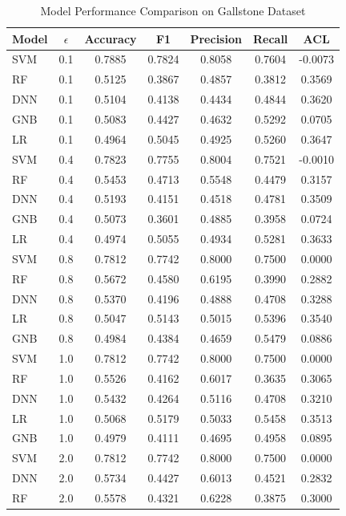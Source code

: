 \begin{table}[h]
\centering
\caption{Model Performance Comparison on Gallstone Dataset}
\label{tab:gallstone_comparison}
\begin{tabular}{lcccccc}
\hline
Model & $\epsilon$ & Accuracy & F1 & Precision & Recall & ACL \\
\hline
SVM & 0.1 & 0.7885 & 0.7824 & 0.8058 & 0.7604 & -0.0073 \\
RF & 0.1 & 0.5125 & 0.3867 & 0.4857 & 0.3812 & 0.3569 \\
DNN & 0.1 & 0.5104 & 0.4138 & 0.4434 & 0.4844 & 0.3620 \\
GNB & 0.1 & 0.5083 & 0.4427 & 0.4632 & 0.5292 & 0.0705 \\
LR & 0.1 & 0.4964 & 0.5045 & 0.4925 & 0.5260 & 0.3647 \\
\hline
SVM & 0.4 & 0.7823 & 0.7755 & 0.8004 & 0.7521 & -0.0010 \\
RF & 0.4 & 0.5453 & 0.4713 & 0.5548 & 0.4479 & 0.3157 \\
DNN & 0.4 & 0.5193 & 0.4151 & 0.4518 & 0.4781 & 0.3509 \\
GNB & 0.4 & 0.5073 & 0.3601 & 0.4885 & 0.3958 & 0.0724 \\
LR & 0.4 & 0.4974 & 0.5055 & 0.4934 & 0.5281 & 0.3633 \\
\hline
SVM & 0.8 & 0.7812 & 0.7742 & 0.8000 & 0.7500 & 0.0000 \\
RF & 0.8 & 0.5672 & 0.4580 & 0.6195 & 0.3990 & 0.2882 \\
DNN & 0.8 & 0.5370 & 0.4196 & 0.4888 & 0.4708 & 0.3288 \\
LR & 0.8 & 0.5047 & 0.5143 & 0.5015 & 0.5396 & 0.3540 \\
GNB & 0.8 & 0.4984 & 0.4384 & 0.4659 & 0.5479 & 0.0886 \\
\hline
SVM & 1.0 & 0.7812 & 0.7742 & 0.8000 & 0.7500 & 0.0000 \\
RF & 1.0 & 0.5526 & 0.4162 & 0.6017 & 0.3635 & 0.3065 \\
DNN & 1.0 & 0.5432 & 0.4264 & 0.5116 & 0.4708 & 0.3210 \\
LR & 1.0 & 0.5068 & 0.5179 & 0.5033 & 0.5458 & 0.3513 \\
GNB & 1.0 & 0.4979 & 0.4111 & 0.4695 & 0.4958 & 0.0895 \\
\hline
SVM & 2.0 & 0.7812 & 0.7742 & 0.8000 & 0.7500 & 0.0000 \\
DNN & 2.0 & 0.5734 & 0.4427 & 0.6013 & 0.4521 & 0.2832 \\
RF & 2.0 & 0.5578 & 0.4321 & 0.6228 & 0.3875 & 0.3000 \\

\end{tabular}
\end{table}
